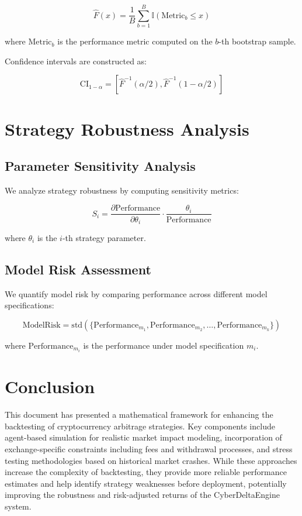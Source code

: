 \documentclass{article}
\begin{document}
\begin{equation}
\hat{F}(x) = \frac{1}{B} \sum_{b=1}^{B} \mathbb{I}(\text{Metric}_b \leq x)
\end{equation}

where $\text{Metric}_b$ is the performance metric computed on the $b$-th bootstrap sample.

Confidence intervals are constructed as:

\begin{equation}
\text{CI}_{1-\alpha} = [\hat{F}^{-1}(\alpha/2), \hat{F}^{-1}(1-\alpha/2)]
\end{equation}

\section{Strategy Robustness Analysis}

\subsection{Parameter Sensitivity Analysis}

We analyze strategy robustness by computing sensitivity metrics:

\begin{equation}
S_i = \frac{\partial \text{Performance}}{\partial \theta_i} \cdot \frac{\theta_i}{\text{Performance}}
\end{equation}

where $\theta_i$ is the $i$-th strategy parameter.

\subsection{Model Risk Assessment}

We quantify model risk by comparing performance across different model specifications:

\begin{equation}
\text{ModelRisk} = \text{std}(\{\text{Performance}_{m_1}, \text{Performance}_{m_2}, \ldots, \text{Performance}_{m_k}\})
\end{equation}

where $\text{Performance}_{m_i}$ is the performance under model specification $m_i$.

\section{Conclusion}

This document has presented a mathematical framework for enhancing the backtesting of cryptocurrency arbitrage strategies. Key components include agent-based simulation for realistic market impact modeling, incorporation of exchange-specific constraints including fees and withdrawal processes, and stress testing methodologies based on historical market crashes. While these approaches increase the complexity of backtesting, they provide more reliable performance estimates and help identify strategy weaknesses before deployment, potentially improving the robustness and risk-adjusted returns of the CyberDeltaEngine system.
\end{document}
